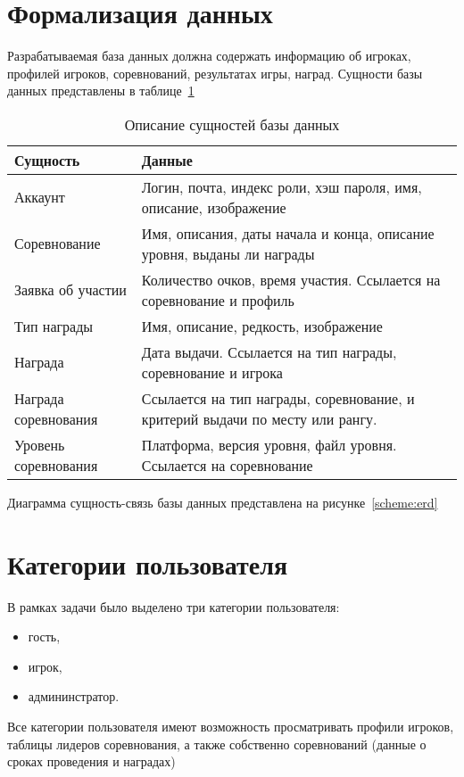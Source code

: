 \section{Формализация данных}
Разрабатываемая база данных должна содержать информацию об игроках, профилей игроков, соревнований, результатах игры, наград. Сущности базы данных представлены в таблице~\ref{tbl:dataop}

\begin{table}[h!]
	\centering
	\caption{\label{tbl:dataop}Описание сущностей базы данных}
	\begin{tabular}{|l|p{8cm}|}
		\hline
		Сущность & Данные \\\hline
		Аккаунт & Логин, почта, индекс роли, хэш пароля, имя, описание, изображение \\\hline
		Соревнование & Имя, описания, даты начала и конца, описание уровня, выданы ли награды \\\hline
		Заявка об участии & Количество очков, время участия. Ссылается на соревнование и профиль \\\hline
		Тип награды & Имя, описание, редкость, изображение\\\hline
		Награда & Дата выдачи. Ссылается на тип награды, соревнование и игрока \\\hline
		Награда соревнования & Ссылается на тип награды, соревнование, и критерий выдачи по месту или рангу.\\\hline
		Уровень соревнования & Платформа, версия уровня, файл уровня. Ссылается на соревнование\\\hline
	\end{tabular}
\end{table}
\FloatBarrier
Диаграмма сущность-связь базы данных представлена на рисунке~\ref{scheme:erd}

\FloatBarrier
\section{Категории пользователя}

В рамках задачи было выделено три категории пользователя:
\begin{itemize}
	\item гость,
	\item игрок,
	\item админинстратор.
\end{itemize}

Все категории пользователя имеют возможность просматривать профили игроков, таблицы лидеров соревнования, а также собственно соревнований (данные о сроках проведения и наградах)

